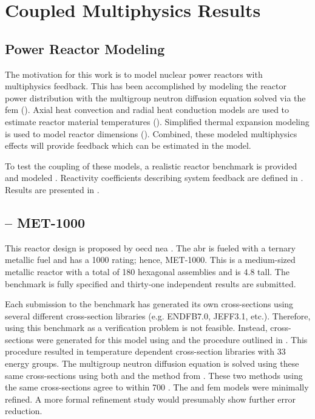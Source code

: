 \chapter{Coupled Multiphysics Results}
\label{ch:coupledResults}

\section{Power Reactor Modeling}
\label{sec:power_reactor_modeling}
  The motivation for this work is to model nuclear power reactors with
  multiphysics feedback. This has been accomplished by modeling the reactor 
  power distribution with the multigroup neutron diffusion equation solved via 
  the \gls{fem} (). Axial heat
  convection and radial heat conduction models are used to estimate reactor
  material temperatures ().
  Simplified thermal expansion modeling is used to model reactor dimensions 
  (). Combined, these modeled multiphysics effects 
  will provide feedback which can be estimated in the model. 
  
  To test the coupling of these models, a realistic reactor benchmark is 
  provided and modeled . Reactivity coefficients describing system 
  feedback are defined in . Results are 
  presented in .

\section{ -- MET-1000}
\label{sec:abr}
  This reactor design is proposed by \gls{oecd} \gls{nea} \cite{abr}. The 
  \gls{abr} is fueled with a ternary metallic fuel and has a 1000
   rating; hence, MET-1000. This is a medium-sized metallic reactor 
  with a total of 180 hexagonal assemblies and is 4.8  tall. The 
  benchmark is fully specified and thirty-one independent results are submitted. 
  
  Each submission to the benchmark has generated its own cross-sections using 
  several different cross-section libraries (e.g. ENDFB7.0, JEFF3.1, etc.). 
  Therefore, using this benchmark as a verification problem is not feasible.
  Instead, cross-sections were generated for this model using \mcc and the
  procedure outlined in . This procedure 
  resulted  in temperature dependent cross-section libraries with 33 energy 
  groups. The  multigroup neutron diffusion equation is solved using these same
  cross-sections using both \dif and the method from 
  .  These two methods using the same cross-sections 
  agree to within 700 . The \dif and \gls{fem} models were minimally 
  refined. A more formal refinement study would presumably show further error 
  reduction.

